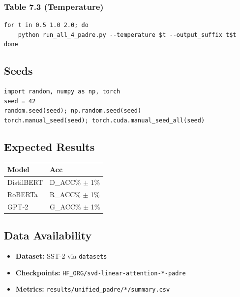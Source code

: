 \subsubsection{Table 7.3 (Temperature)}
\begin{lstlisting}
for t in 0.5 1.0 2.0; do
    python run_all_4_padre.py --temperature $t --output_suffix t$t
done
\end{lstlisting}

\subsection{Seeds}

\begin{lstlisting}
import random, numpy as np, torch
seed = 42
random.seed(seed); np.random.seed(seed)
torch.manual_seed(seed); torch.cuda.manual_seed_all(seed)
\end{lstlisting}

\subsection{Expected Results}

\begin{table}[H]
\centering
\small
\begin{tabular}{ll}
\toprule
\textbf{Model} & \textbf{Acc} \\
\midrule
DistilBERT & {{D\_ACC}}\% $\pm$ 1\% \\
RoBERTa & {{R\_ACC}}\% $\pm$ 1\% \\
GPT-2 & {{G\_ACC}}\% $\pm$ 1\% \\
\bottomrule
\end{tabular}
\end{table}

\subsection{Data Availability}

\begin{itemize}
\item \textbf{Dataset:} SST-2 via \texttt{datasets}
\item \textbf{Checkpoints:} \texttt{{{HF\_ORG}}/svd-linear-attention-*-padre}
\item \textbf{Metrics:} \texttt{results/unified\_padre/*/summary.csv}

\end{itemize}
